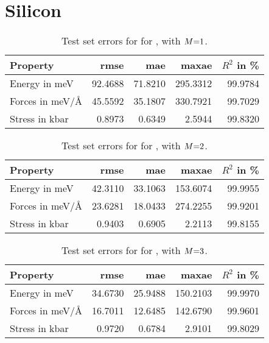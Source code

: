 \clearpage
\section{Silicon}
\label{sec:si-si}

\begin{table}
\label{tab:si-si_errors_m1}
\caption{Test set errors for \sok for , with $M{=}1$.}
\begin{tabular}{l | r r r r}
\toprule
Property & \acs{rmse} & \acs{mae} & \acs{maxae} & $R^2$ in \unit{\percent} \\
\midrule
Energy in \unit{meV} & \num{92.4688} & \num{71.8210} & \num{295.3312} & \num{99.9784} \\
Forces in \unit{meV/\angstrom} & \num{45.5592} & \num{35.1807} & \num{330.7921} & \num{99.7029} \\
Stress in \unit{kbar} & \num{0.8973} & \num{0.6349} & \num{2.5944} & \num{99.8320} \\
\bottomrule
\end{tabular}
\end{table}

\begin{table}
\label{tab:si-si_errors_m2}
\caption{Test set errors for \sok for , with $M{=}2$.}
\begin{tabular}{l | r r r r}
\toprule
Property & \acs{rmse} & \acs{mae} & \acs{maxae} & $R^2$ in \unit{\percent} \\
\midrule
Energy in \unit{meV} & \num{42.3110} & \num{33.1063} & \num{153.6074} & \num{99.9955} \\
Forces in \unit{meV/\angstrom} & \num{23.6281} & \num{18.0433} & \num{274.2255} & \num{99.9201} \\
Stress in \unit{kbar} & \num{0.9403} & \num{0.6905} & \num{2.2113} & \num{99.8155} \\
\bottomrule
\end{tabular}
\end{table}

\begin{table}
\label{tab:si-si_errors_m3}
\caption{Test set errors for \sok for , with $M{=}3$.}
\begin{tabular}{l | r r r r}
\toprule
Property & \acs{rmse} & \acs{mae} & \acs{maxae} & $R^2$ in \unit{\percent} \\
\midrule
Energy in \unit{meV} & \num{34.6730} & \num{25.9488} & \num{150.2103} & \num{99.9970} \\
Forces in \unit{meV/\angstrom} & \num{16.7011} & \num{12.6485} & \num{142.6790} & \num{99.9601} \\
Stress in \unit{kbar} & \num{0.9720} & \num{0.6784} & \num{2.9101} & \num{99.8029} \\
\bottomrule
\end{tabular}
\end{table}

